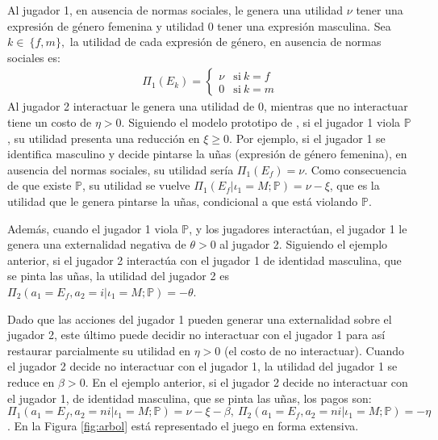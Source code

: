 Al jugador 1, en ausencia de normas sociales, le genera una utilidad $\nu$ tener una expresión de género femenina y utilidad $0$ tener una expresión masculina. Sea $k \in~\{f,m\},$ la utilidad de cada expresión de género, en ausencia de normas sociales es: 
\begin{align*}
 \Pi_1(E_k)=   
\begin{cases}
    \nu & \text{si} \ k=f \\
    0 & \text{si} \ k=m
\end{cases}
\end{align*}
Al jugador 2 interactuar le genera una utilidad de $0$, mientras que no interactuar tiene un costo de $\eta>0$. Siguiendo el modelo prototipo de \cite{akerlof2000economics}, si el jugador 1 viola $\mathbb{P}$, su utilidad presenta una reducción en $\xi\geq0$.  Por ejemplo, si el jugador 1 se identifica masculino y decide pintarse la uñas (expresión de género femenina), en ausencia del normas sociales, su utilidad sería $\Pi_1(E_f)=\nu$.  Como consecuencia de que existe $\mathbb{P}$, su utilidad se vuelve  $\Pi_1(E_f|\iota_1=M; \mathbb{P})=\nu-\xi$, que es la utilidad que le genera pintarse la uñas, condicional a que está violando $\mathbb{P}$.

Además, cuando el jugador 1 viola $\mathbb{P}$, y los jugadores interactúan, el jugador 1 le genera una externalidad negativa de $\theta>0$ al jugador 2. Siguiendo el ejemplo anterior, si el jugador 2 interactúa con el jugador 1 de identidad masculina, que se pinta las uñas, la utilidad del jugador 2 es $\Pi_2(a_1=E_f, a_2=i|\iota_1=M; \mathbb{P})=-\theta$.

Dado que las acciones del jugador 1 pueden generar una externalidad sobre el jugador 2, este último puede decidir no interactuar con el jugador 1 para así restaurar parcialmente su utilidad en $\eta>0$ (el costo de no interactuar). Cuando el jugador 2 decide no interactuar con el jugador 1, la utilidad del jugador 1 se reduce en $\beta>0$. En el ejemplo anterior, si el jugador 2 decide no interactuar con el jugador 1, de identidad masculina, que se pinta las uñas,   los pagos son: $\Pi_1(a_1=E_f, a_2=ni|\iota_1=M; \mathbb{P})=\nu-\xi-\beta,\ \Pi _2(a_1=E_f, a_2=ni|\iota_1=M; \mathbb{P})=-\eta$. En la Figura \ref{fig:arbol} está representado el juego en forma extensiva. 

